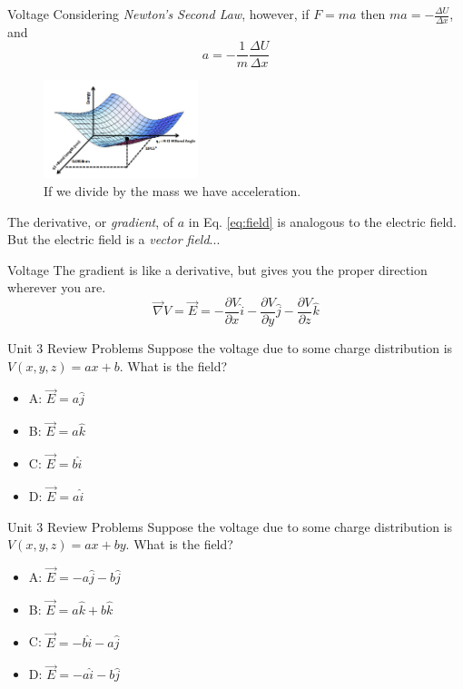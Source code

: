 \documentclass{beamer}
\begin{document}
\begin{frame}{Voltage}
\small
Considering \textit{Newton's Second Law}, however, if $F = m a$ then $m a = -\frac{\Delta U}{\Delta x}$, and
\begin{equation}
a = -\frac{1}{m}\frac{\Delta U}{\Delta x} \label{eq:field}
\end{equation}
\begin{figure}
\centering
\includegraphics[width=0.4\textwidth]{figures/potential.png}
\caption{\label{fig:potential2} If we divide by the mass we have acceleration.}
\end{figure}
The derivative, or \textit{gradient}, of $a$ in Eq. \ref{eq:field} is analogous to the electric field.  But the electric field is a \textit{vector field}...
\end{frame}

\begin{frame}{Voltage}
The gradient is like a derivative, but gives you the proper direction wherever you are.
\begin{equation}
\boxed{
\vec{\nabla} V = \vec{E} = -\frac{\partial V}{\partial x}\hat{i}-\frac{\partial V}{\partial y}\hat{j}-\frac{\partial V}{\partial z}\hat{k}}
\end{equation}
\end{frame}

\begin{frame}{Unit 3 Review Problems}
Suppose the voltage due to some charge distribution is $V(x,y,z) = ax+b$.  What is the field?
\begin{itemize}
\item A: $\vec{E} = a\hat{j}$
\item B: $\vec{E} = a\hat{k}$
\item C: $\vec{E} = b\hat{i}$
\item D: $\vec{E} = a\hat{i}$
\end{itemize}
\end{frame}

\begin{frame}{Unit 3 Review Problems}
Suppose the voltage due to some charge distribution is $V(x,y,z) = ax+by$.  What is the field?
\begin{itemize}
\item A: $\vec{E} = -a\hat{j}-b\hat{j}$
\item B: $\vec{E} = a\hat{k}+b\hat{k}$
\item C: $\vec{E} = -b\hat{i}-a\hat{j}$
\item D: $\vec{E} = -a\hat{i}-b\hat{j}$
\end{itemize}
\end{frame}
\end{document}
